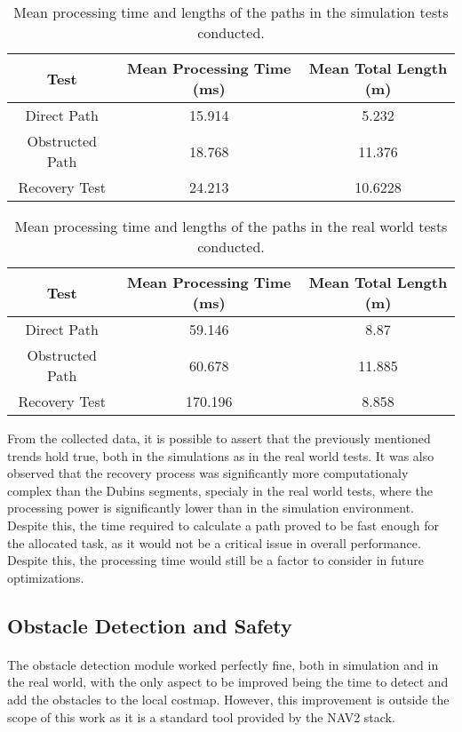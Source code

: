 
\begin{table}[H]
    \centering
    \begin{tabular}{|c|c|c|}
        \hline
        \textbf{Test}  & \textbf{Mean Processing Time (ms)} & \textbf{Mean Total Length (m)}\\
        \hline
        Direct Path & 15.914 & 5.232  \\
        \hline
        Obstructed Path & 18.768 & 11.376  \\
        \hline
        Recovery Test & 24.213  & 10.6228  \\
        \hline
    \end{tabular}
    \caption{Mean processing time and lengths of the paths in the simulation tests conducted.}
    \label{tab:mean_processing_time_lengths}
\end{table}
\begin{table}[H]
    \centering
    \begin{tabular}{|c|c|c|}
        \hline
        \textbf{Test}  & \textbf{Mean Processing Time (ms)} & \textbf{Mean Total Length (m)}\\
        \hline
        Direct Path & 59.146 & 8.87  \\
        \hline
        Obstructed Path & 60.678 & 11.885  \\
        \hline
        Recovery Test & 170.196  & 8.858  \\
        \hline
    \end{tabular}
    \caption{Mean processing time and lengths of the paths in the real world tests conducted.}
    \label{tab:mean_processing_time_lengths}
\end{table}

From the collected data, it is possible to assert that the previously mentioned trends hold true, both in 
the simulations as in the real world tests. It was also observed that the recovery process was significantly 
more computationaly complex than the Dubins segments, specialy in the real world tests, where the processing power 
is significantly lower than in the simulation environment. Despite this, the time required to calculate a path proved 
to be fast enough for the allocated task, as it would not be a critical issue in overall performance. Despite this, 
the processing time would still be a factor to consider in future optimizations.

\subsection{Obstacle Detection and Safety}
\paragraph{} The obstacle detection module worked perfectly fine, both in simulation and in the real world, 
with the only aspect to be improved being the time to detect and add the obstacles to the local costmap. However, 
this improvement is outside the scope of this work as it is a standard tool provided by the \gls{NAV2} stack.